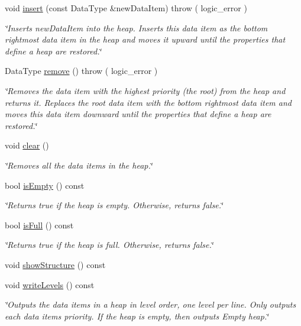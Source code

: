 \begin{DoxyCompactItemize}
void \hyperlink{class_heap_aa68cf80454ab1b246fa723612805a91e}{insert} (const Data\+Type \&new\+Data\+Item)  throw ( logic\+\_\+error )
\begin{DoxyCompactList}\small\item\em \char`\"{}\+Inserts new\+Data\+Item into the heap. Inserts this data item as the bottom rightmost data item in the heap and moves it upward until the properties that define a heap are restored.\char`\"{} \end{DoxyCompactList}\item 
Data\+Type \hyperlink{class_heap_a4a18bfdacd897c45fc3da13f22b8930d}{remove} ()  throw ( logic\+\_\+error )
\begin{DoxyCompactList}\small\item\em \char`\"{}\+Removes the data item with the highest priority (the root) from the heap and returns it. Replaces the root data item with the bottom rightmost data item and moves this data item downward until the properties that define a heap are restored.\char`\"{} \end{DoxyCompactList}\item 
void \hyperlink{class_heap_a19a78c8eae2cf7c8253e34e54d86ed73}{clear} ()
\begin{DoxyCompactList}\small\item\em \char`\"{}\+Removes all the data items in the heap.\char`\"{} \end{DoxyCompactList}\item 
bool \hyperlink{class_heap_ab8fa26d416ac0e27dfcbf18c54f8f73f}{is\+Empty} () const 
\begin{DoxyCompactList}\small\item\em \char`\"{}\+Returns true if the heap is empty. Otherwise, returns false.\char`\"{} \end{DoxyCompactList}\item 
bool \hyperlink{class_heap_ac9111b884c74a376240e0155a788756e}{is\+Full} () const 
\begin{DoxyCompactList}\small\item\em \char`\"{}\+Returns true if the heap is full. Otherwise, returns false.\char`\"{} \end{DoxyCompactList}\item 
void \hyperlink{class_heap_a3ae1e1f27a145749c8b9f2da777cb8bc}{show\+Structure} () const 
\item 
void \hyperlink{class_heap_a4bdb1772ea92899de245d6cbd217d085}{write\+Levels} () const 
\begin{DoxyCompactList}\small\item\em \char`\"{}\+Outputs the data items in a heap in level order, one level per line. Only outputs each data item\textquotesingle{}s priority. If the heap is empty, then outputs \textquotesingle{}\+Empty heap\textquotesingle{}.\char`\"{} \end{DoxyCompactList}\item 

\end{DoxyCompactItemize}
